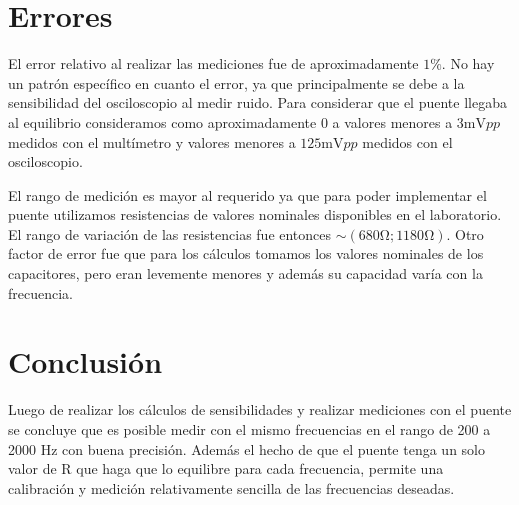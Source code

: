 \section{Errores}
El error relativo al realizar las mediciones fue de aproximadamente $1 \% $. No hay un 
patrón específico en cuanto el error, ya que principalmente se debe a la sensibilidad del 
osciloscopio al medir ruido. Para considerar que el puente llegaba al equilibrio consideramos 
como aproximadamente 0 a valores menores a $3\si{\milli\volt}pp$ medidos con el multímetro y valores menores a 
$125\si{\milli\volt}pp$ medidos con el osciloscopio.

El rango de medición es mayor al requerido ya que para poder implementar el puente utilizamos 
resistencias de valores nominales disponibles en el laboratorio. El rango de variación de las 
resistencias fue entonces $\sim (680 \si{\ohm}; 1180 \si{\ohm})$. Otro factor de error fue que
para los cálculos tomamos los valores nominales de los capacitores, pero eran levemente 
menores y además su capacidad varía con la frecuencia.


\section{Conclusión}

Luego de realizar los cálculos de sensibilidades y realizar mediciones con el puente se concluye que es posible medir con el mismo frecuencias en el rango de 200 a  2000 Hz con buena precisión. Además el hecho de que el puente tenga un solo valor de R que haga que lo equilibre para cada frecuencia, permite una calibración y medición relativamente sencilla de las frecuencias deseadas.